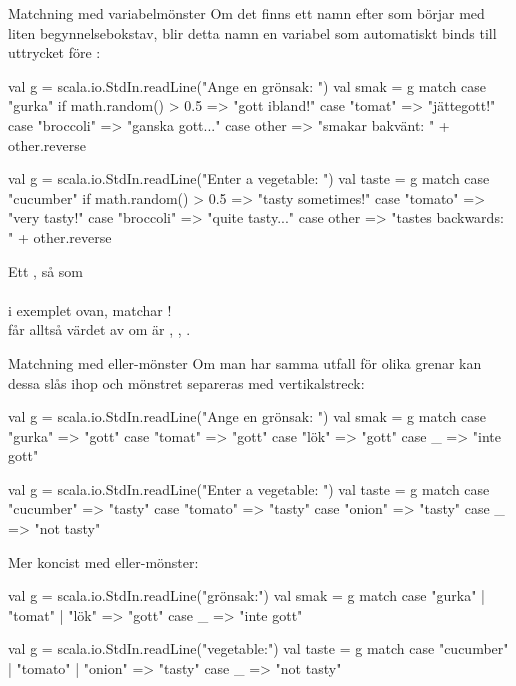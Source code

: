 \begin{Slide}{Matchning med variabelmönster}\SlideFontSmall
Om det finns ett namn efter  som börjar med liten begynnelsebokstav, blir detta namn en variabel som automatiskt binds till uttrycket före :

\ifswedish
\begin{Code}
val g = scala.io.StdIn.readLine("Ange en grönsak: ")
val smak = g match 
  case "gurka" if math.random() > 0.5 => "gott ibland!"
  case "tomat" => "jättegott!"
  case "broccoli" => "ganska gott..."
  case other => "smakar bakvänt: " + other.reverse
\end{Code}
\else
\begin{Code}
val g = scala.io.StdIn.readLine("Enter a vegetable: ")
val taste = g match 
  case "cucumber" if math.random() > 0.5 => "tasty sometimes!"
  case "tomato" => "very tasty!"
  case "broccoli" => "quite tasty..."
  case other => "tastes backwards: " + other.reverse
\end{Code}
\fi{}

Ett  , så som \\  \\ i exemplet ovan, matchar ! \\ får alltså värdet av  om   är \ifswedish{}\else{}\fi{}, \ifswedish{}\else{}\fi{}, .

\end{Slide}


\begin{Slide}{Matchning med eller-mönster}\SlideFontSmall
Om man har samma utfall för olika grenar kan dessa slås ihop och mönstret separeras med vertikalstreck: \code{|}
\ifswedish
\begin{Code}
val g = scala.io.StdIn.readLine("Ange en grönsak: ")
val smak = g match 
  case "gurka" => "gott"
  case "tomat" => "gott"
  case "lök"   => "gott"
  case _ => "inte gott"
\end{Code}
\else
\begin{Code}
val g = scala.io.StdIn.readLine("Enter a vegetable: ")
val taste = g match 
  case "cucumber" => "tasty"
  case "tomato" => "tasty"
  case "onion"   => "tasty"
  case _ => "not tasty"
\end{Code}
\fi{}

Mer koncist med eller-mönster:

\ifswedish
\begin{Code}
val g = scala.io.StdIn.readLine("grönsak:")
val smak = g match 
  case "gurka" | "tomat" | "lök" => "gott"
  case _ => "inte gott"
\end{Code}
\else
\begin{Code}
val g = scala.io.StdIn.readLine("vegetable:")
val taste = g match 
  case "cucumber" | "tomato" | "onion" => "tasty"
  case _ => "not tasty"
\end{Code}
\fi{}



\end{Slide}





